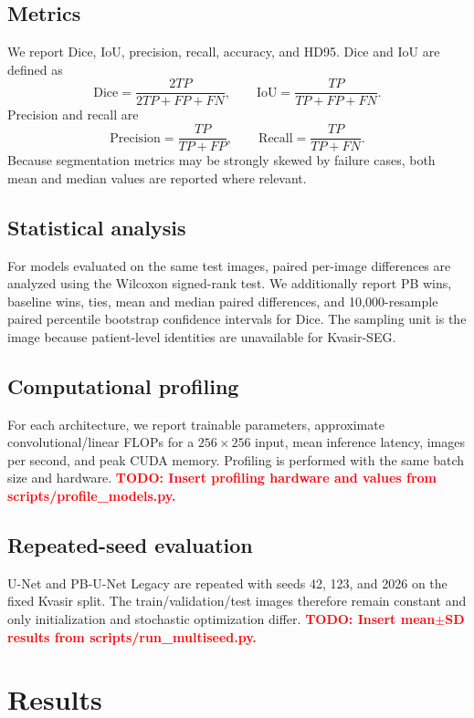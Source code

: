 \documentclass[11pt]{article}
\newcommand{\todoresult}[1]{\textcolor{red}{\textbf{TODO: #1}}}
\begin{document}
\subsection{Metrics}
We report Dice, IoU, precision, recall, accuracy, and HD95. Dice and IoU are defined as
\begin{equation}
\mathrm{Dice}=\frac{2TP}{2TP+FP+FN}, \qquad
\mathrm{IoU}=\frac{TP}{TP+FP+FN}.
\end{equation}
Precision and recall are
\begin{equation}
\mathrm{Precision}=\frac{TP}{TP+FP}, \qquad
\mathrm{Recall}=\frac{TP}{TP+FN}.
\end{equation}
Because segmentation metrics may be strongly skewed by failure cases, both mean and median values are reported where relevant.

\subsection{Statistical analysis}
For models evaluated on the same test images, paired per-image differences are analyzed using the Wilcoxon signed-rank test. We additionally report PB wins, baseline wins, ties, mean and median paired differences, and 10,000-resample paired percentile bootstrap confidence intervals for Dice. The sampling unit is the image because patient-level identities are unavailable for Kvasir-SEG.

\subsection{Computational profiling}
For each architecture, we report trainable parameters, approximate convolutional/linear FLOPs for a $256\times256$ input, mean inference latency, images per second, and peak CUDA memory. Profiling is performed with the same batch size and hardware. \todoresult{Insert profiling hardware and values from scripts/profile\_models.py.}

\subsection{Repeated-seed evaluation}
U-Net and PB-U-Net Legacy are repeated with seeds 42, 123, and 2026 on the fixed Kvasir split. The train/validation/test images therefore remain constant and only initialization and stochastic optimization differ. \todoresult{Insert mean$\pm$SD results from scripts/run\_multiseed.py.}

\section{Results}
\end{document}
